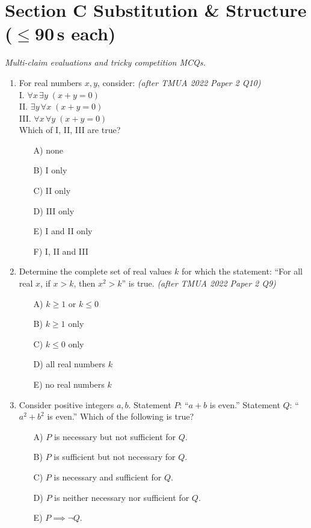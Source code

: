 \documentclass[11pt,a4paper]{article}
\begin{document}
\section*{Section C \quad Substitution \& Structure \hfill{\normalfont\small($\leq$90\,s each)}}

\noindent\textit{Multi-claim evaluations and tricky competition MCQs.}

\begin{enumerate}

\item For real numbers $x,y$, consider: \textit{\small(after TMUA 2022 Paper 2 Q10)}\\
I. $\forall x \, \exists y \; (x+y = 0)$\\
II. $\exists y \, \forall x \; (x+y = 0)$\\
III. $\forall x \, \forall y \; (x+y = 0)$\\
Which of I, II, III are true?
\begin{itemize}
\item[A)] none
\item[B)] I only
\item[C)] II only
\item[D)] III only
\item[E)] I and II only
\item[F)] I, II and III
\end{itemize}

\item Determine the complete set of real values $k$ for which the statement: ``For all real $x$, if $x > k$, then $x^2 > k$'' is true. \textit{\small(after TMUA 2022 Paper 2 Q9)}
\begin{itemize}
\item[A)] $k \ge 1$ or $k \le 0$
\item[B)] $k \ge 1$ only
\item[C)] $k \le 0$ only
\item[D)] all real numbers $k$
\item[E)] no real numbers $k$
\end{itemize}

\item Consider positive integers $a,b$. Statement $P$: ``$a+b$ is even.'' Statement $Q$: ``$a^2 + b^2$ is even.'' Which of the following is true?
\begin{itemize}
\item[A)] $P$ is necessary but not sufficient for $Q$.
\item[B)] $P$ is sufficient but not necessary for $Q$.
\item[C)] $P$ is necessary and sufficient for $Q$.
\item[D)] $P$ is neither necessary nor sufficient for $Q$.
\item[E)] $P \implies \neg Q$.
\end{itemize}


\end{enumerate}
\end{document}
